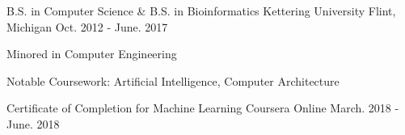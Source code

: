 
\begin{cventries}




  \cventry
    {B.S. in Computer Science \& B.S. in Bioinformatics} %
    {Kettering University} %
    {Flint, Michigan} %
    {Oct. 2012 - June. 2017} %
    {
      \begin{cvitems} %
        \item {Minored in Computer Engineering}
        \item {Notable Coursework: Artificial Intelligence, Computer Architecture}
      \end{cvitems}
    }


  \cventry
    {Certificate of Completion for Machine Learning} %
    {Coursera} %
    {Online} %
    {March. 2018 - June. 2018} %
    {
      \begin{cvitems} %
      \end{cvitems}
    }

\end{cventries}
